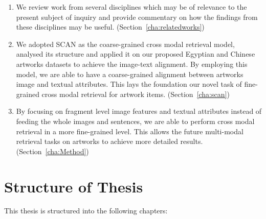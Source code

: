 \begin{enumerate}
    \item We review work from several disciplines which may be of relevance to the present subject of inquiry and provide commentary on how the findings from these disciplines may be useful. (Section~\ref{cha:relatedworks})
    \item We adopted SCAN \cite{scan} as the coarse-grained cross modal retrieval model, analysed its structure and applied it on our proposed Egyptian and Chinese artworks datasets to achieve the image-text alignment. 
    By employing this model, we are able to have a coarse-grained alignment between artworks image and textual attributes. This lays the foundation our novel task of fine-grained cross modal retrieval for artwork items. (Section~\ref{cha:scan})
    \item By focusing on fragment level image features and textual attributes instead of feeding the whole images and sentences, we are able to perform cross modal retrieval in a more fine-grained level. This allows the future multi-modal retrieval tasks on artworks to achieve more
    detailed results. (Section~\ref{cha:Method})
\end{enumerate}


\section{Structure of Thesis}

This thesis is structured into the following chapters:

